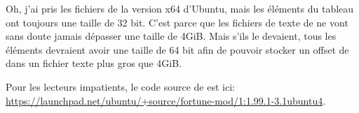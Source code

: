 Oh, j'ai pris les fichiers de la version x64 d'Ubuntu, mais les éléments du tableau
ont toujours une taille de 32 bit.
C'est parce que les fichiers de texte de  ne vont sans doute jamais dépasser
une taille de 4\ac{GiB}.
Mais s'ils le devaient, tous les éléments devraient avoir une taille de 64 bit afin
de pouvoir stocker un offset de dans un fichier texte plus gros que 4GiB.

Pour les lecteurs impatients, le code source de  est ici:
\url{https://launchpad.net/ubuntu/+source/fortune-mod/1:1.99.1-3.1ubuntu4}.

